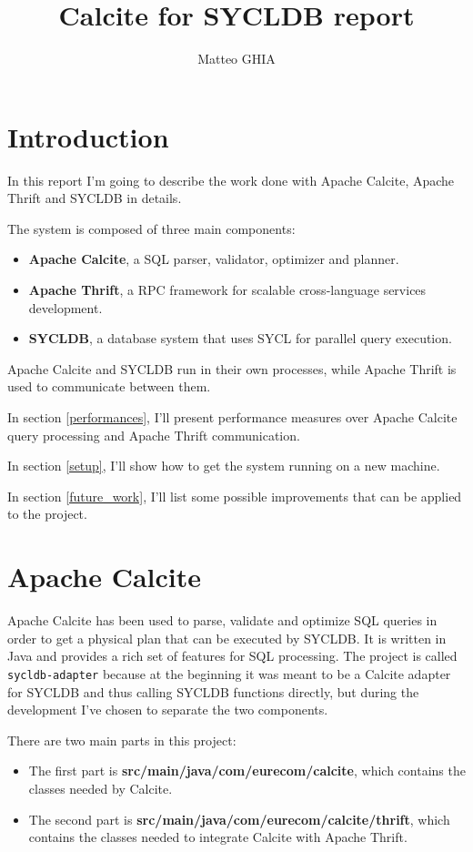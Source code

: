 \documentclass[a4paper, 10pt]{article}
\title{Calcite for SYCLDB report}
\author{Matteo GHIA}
\begin{document}
\maketitle

\section{Introduction}

In this report I'm going to describe the work done with Apache Calcite, Apache Thrift and SYCLDB in details.

The system is composed of three main components:
\begin{itemize}
    \item \textbf{Apache Calcite}, a SQL parser, validator, optimizer and planner.
    \item \textbf{Apache Thrift}, a RPC framework for scalable cross-language services development.
    \item \textbf{SYCLDB}, a database system that uses SYCL for parallel query execution.
\end{itemize}
Apache Calcite and SYCLDB run in their own processes, while Apache Thrift is used to communicate between them.

In section \ref{performances}, I'll present performance measures over Apache Calcite query processing and Apache Thrift communication.

In section \ref{setup}, I'll show how to get the system running on a new machine.

In section \ref{future_work}, I'll list some possible improvements that can be applied to the project.

\section{Apache Calcite}

Apache Calcite has been used to parse, validate and optimize SQL queries in order to get a physical plan that can be executed by SYCLDB. It is written in Java and provides a rich set of features for SQL processing. The project is called \texttt{sycldb-adapter} because at the beginning it was meant to be a Calcite adapter for SYCLDB and thus calling SYCLDB functions directly, but during the development I've chosen to separate the two components.

There are two main parts in this project:
\begin{itemize}
    \item The first part is \textbf{src/main/java/com/eurecom/calcite}, which contains the classes needed by Calcite.
    \item The second part is \textbf{src/main/java/com/eurecom/calcite/thrift}, which contains the classes needed to integrate Calcite with Apache Thrift.
\end{itemize}
\end{document}
